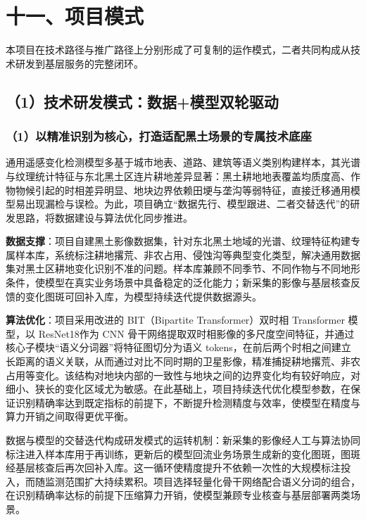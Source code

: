 \section{十一、项目模式}

本项目在技术路径与推广路径上分别形成了可复制的运作模式，二者共同构成从技术研发到基层服务的完整闭环。

\subsection{（1）技术研发模式：数据+模型双轮驱动}

\subsubsection{（1）以精准识别为核心，打造适配黑土场景的专属技术底座}

通用遥感变化检测模型多基于城市地表、道路、建筑等语义类别构建样本，其光谱与纹理统计特征与东北黑土区连片耕地差异显著：黑土耕地地表覆盖均质度高、作物物候引起的时相差异明显、地块边界依赖田埂与垄沟等弱特征，直接迁移通用模型易出现漏检与误检。为此，项目确立“数据先行、模型跟进、二者交替迭代”的研发思路，将数据建设与算法优化同步推进。

\textbf{数据支撑}：项目自建黑土影像数据集，针对东北黑土地域的光谱、纹理特征构建专属样本库，系统标注耕地撂荒、非农占用、侵蚀沟等典型变化类型，解决通用数据集对黑土区耕地变化识别不准的问题。样本库兼顾不同季节、不同作物与不同地形条件，使模型在真实业务场景中具备稳定的泛化能力；新采集的影像与基层核查反馈的变化图斑可回补入库，为模型持续迭代提供数据源头。

\textbf{算法优化}：项目采用改进的 BIT（Bipartite Transformer）双时相 Transformer 模型，以 ResNet18作为 CNN 骨干网络提取双时相影像的多尺度空间特征，并通过核心子模块“语义分词器”将特征图切分为语义 tokens，在前后两个时相之间建立长距离的语义关联，从而通过对比不同时期的卫星影像，精准捕捉耕地撂荒、非农占用等变化。该结构对地块内部的一致性与地块之间的边界变化均有较好响应，对细小、狭长的变化区域尤为敏感。在此基础上，项目持续迭代优化模型参数，在保证识别精确率达到既定指标的前提下，不断提升检测精度与效率，使模型在精度与算力开销之间取得更优平衡。

数据与模型的交替迭代构成研发模式的运转机制：新采集的影像经人工与算法协同标注进入样本库用于再训练，更新后的模型回流业务场景生成新的变化图斑，图斑经基层核查后再次回补入库。这一循环使精度提升不依赖一次性的大规模标注投入，而随监测范围扩大持续累积。项目选择轻量化骨干网络配合语义分词的组合，在识别精确率达标的前提下压缩算力开销，使模型兼顾专业核查与基层部署两类场景。


